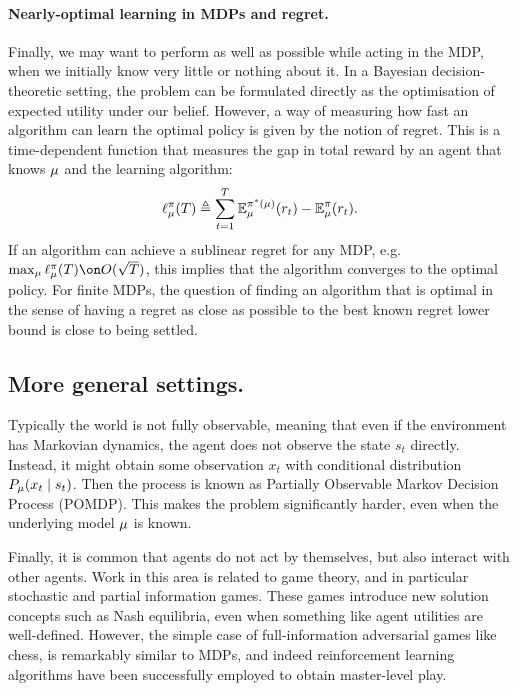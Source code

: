 \paragraph{Nearly-optimal learning in MDPs and regret.}
Finally, we may want to perform as well as possible while acting in the MDP, when we initially know very little or nothing about it. In a Bayesian decision-theoretic setting, the problem can be formulated directly as the optimisation of expected utility under our belief. However, a way of measuring how fast an algorithm can learn the optimal policy is given by the notion of regret. This is a time-dependent function that measures the gap in total reward by an agent that knows $\mu$ and the learning algorithm:
\[
\ell_\mu^\pi(T) \mathrel{\triangleq} \sum_{t=1}^T \mathop{\mbox{\ensuremath{\mathbb{E}}}}\nolimits_\mu^{\pi^*(\mu)} (r_t) - \mathop{\mbox{\ensuremath{\mathbb{E}}}}\nolimits_\mu^{\pi} (r_t).
\]
If an algorithm can achieve a sublinear regret for any MDP, e.g. $\max_\mdp \regret_\mdp^\pol(T) \on O(\sqrt{T})$, this implies that the algorithm converges to the optimal policy. For finite MDPs, the question of finding an algorithm that is optimal in the sense of having a regret as close as possible to the best known regret lower bound is close to being settled.

\subsection{More general settings.}

Typically the world is not fully observable, meaning that even if the environment has Markovian dynamics, the agent does not observe the state $s_t$ directly. Instead, it might obtain some observation $x_t$ with conditional distribution $P_\mu(x_t \mid s_t)$. Then the process is known as Partially Observable Markov Decision Process (POMDP). This makes the problem significantly harder, even when the underlying model $\mu$ is known.

Finally, it is common that agents do not act by themselves, but also interact with other agents. Work in this area is related to game theory, and in particular stochastic and partial information games. These games introduce new solution concepts such as Nash equilibria, even when something like agent utilities are well-defined. However, the simple case of full-information adversarial games like chess, is remarkably similar to MDPs, and indeed reinforcement learning algorithms have been successfully employed to obtain master-level play.




